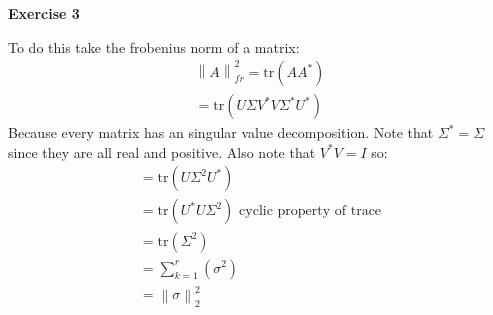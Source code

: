 \documentclass[12pt]{article}
\newcommand{\norm}[1]{\left\lVert#1\right\rVert}
\newenvironment{exercise}[1]{\vspace{.1in}\noindent\textbf{Exercise #1 \hspace{.05em}}}{}
\newcommand{\tr}{\text{tr}}
\theoremstyle{definition}
\theoremstyle{remark}
\begin{document}
\begin{exercise}{3}

	To do this take the frobenius norm of a matrix:
	\begin{align}
		\norm{A}_{fr}^2=\tr(AA^*) \\
		=\tr(U\Sigma V^*V\Sigma^* U^*)
	\end{align}
	Because every matrix has an singular value decomposition. Note that $\Sigma^*=\Sigma$ since they are all real and positive. Also note that $V^*V=I$ so:
	\begin{align}
		=\tr(U\Sigma^2U^*)                                 \\
		=\tr(U^*U\Sigma^2)\text{ cyclic property of trace} \\
		=\tr(\Sigma^2)                                     \\
		=\sum\limits_{k=1}^{r}\left(\sigma^2\right)        \\
		=\norm{\sigma}_2^2
	\end{align}
\end{exercise}
\end{document}
